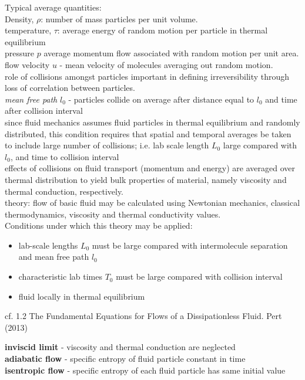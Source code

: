 \documentclass[10pt]{amsart}
\begin{document}
\begin{multicols*}{2}
Typical average quantities: \\
Density, $\rho$: number of mass particles per unit volume. \\
temperature, $\tau$: average energy of random motion per particle in thermal equilibrium \\
pressure $p$ average momentum flow associated with random motion per unit area. \\
flow velocity $u$ - mean velocity of molecules averaging out random motion. \\

role of collisions amongst particles important in defining irreversibility through loss of correlation between particles. \\

\emph{mean free path} $l_0$ - particles collide on average after distance equal to $l_0$ and time after collision interval\\

since fluid mechanics assumes fluid particles in thermal equilibrium and randomly distributed, this condition requires that spatial and temporal averages be taken to include large number of collisions; i.e. lab scale length $L_0$ large compared with $l_0$, and time to collision interval \\

effects of collisions on fluid transport (momentum and energy) are averaged over thermal distribution to yield bulk properties of material, namely viscosity and thermal conduction, respectively. \\

theory: flow of basic fluid may be calculated using Newtonian mechanics, classical thermodynamics, viscosity and thermal conductivity values. \\
Conditions under which this theory may be applied: \\
\begin{itemize}
	\item lab-scale lengths $L_0$ must be large compared with intermolecule separation and mean free path $l_0$ 
	\item characteristic lab times $T_0$ must be large compared with collision interval
	\item fluid locally in thermal equilibrium
\end{itemize}

cf. 1.2 The Fundamental Equations for Flows of a Dissipationless Fluid. Pert (2013) \cite{Pert2013}

\textbf{inviscid limit} - viscosity and thermal conduction are neglected \\
\textbf{adiabatic flow} - specific entropy of fluid particle constant in time \\
\textbf{isentropic flow} - specific entropy of each fluid particle has same initial value \\


\end{multicols*}
\end{document}
